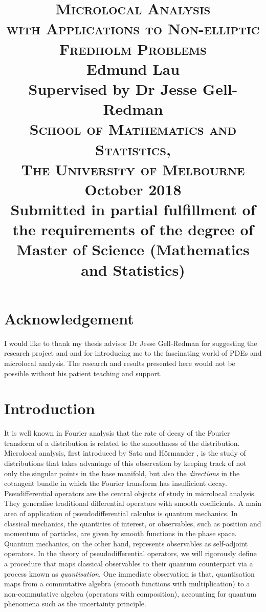 \documentclass[12pt, twoside]{book}
\title{    
    \textsc{\LARGE \textbf{Microlocal Analysis}} \\
    \textsc{\large \textbf{with Applications to Non-elliptic Fredholm Problems}} \\ [5em]
    Edmund Lau \\
    Supervised by Dr Jesse Gell-Redman \\ [5em] 
    \textsc{\Large School of Mathematics and Statistics, \\ The University of Melbourne} \\ [5em]
    {\large October 2018} \\
    {\large Submitted in partial fulfillment of the requirements of the degree of Master of Science (Mathematics and Statistics) } \\
}
\date{}
\begin{document}
\maketitle



\chapter*{Acknowledgement}
I would like to thank my thesis advisor Dr Jesse Gell-Redman for suggesting the research project and and for introducing me to the fascinating world of PDEs and microlocal analysis. The research and results presented here would not be possible without his patient teaching and support. 


\tableofcontents

\chapter{Introduction}

It is well known in Fourier analysis that the rate of decay of the Fourier transform of a distribution is related to the smoothness of the distribution. Microlocal analysis, first introduced by  Sato \cite{Sato1970-on} and H\"ormander \cite{Hormander2007-ws}, is the study of distributions that takes advantage of this observation by keeping track of not only the singular points in the base manifold, but also the \textit{directions} in the cotangent bundle in which the Fourier transform has insufficient decay. \\

Pseudifferential operators are the central objects of study in microlocal analysis. They generalise traditional differential operators with smooth coefficients. A main area of application of pseudodifferential calculus is quantum mechanics\cite{Martinez2002-xg}. In classical  mechanics,  the quantities of interest, or  observables,  such as position and momentum of particles, are given by smooth functions in the phase space. Quantum mechanics, on the other hand, represents observables as self-adjoint operators. In the theory of pseudodifferential operators, we will rigorously define a procedure that maps classical observables to their quantum counterpart via a process known as \textit{quantisation}. One immediate observation is that, quantisation maps from a commutative algebra (smooth functions with multiplication) to a non-commutative algebra (operators with composition), accounting for quantum phenomena such as the uncertainty principle. \\
\end{document}
